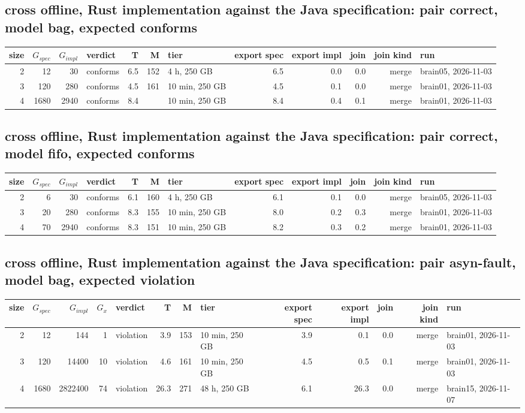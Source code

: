 \documentclass[10pt]{article}
\begin{document}
\subsection*{cross offline, Rust implementation against the Java specification: pair \textsf{correct}, model bag, expected conforms}
\begin{longtable}{@{}rrrlrrlrrrrl@{}}
\toprule
size & $G_{\mathit{spec}}$ & $G_{\mathit{impl}}$ & verdict & T & M & tier & export spec & export impl & join & join kind & run \\
\midrule
\endhead
\color{blue} 2 & 12 & 30 & conforms & 6.5 & 152 & 4 h, 250 GB & 6.5 & 0.0 & 0.0 & merge & brain05, 2026-11-03 \\
\color{blue} 3 & 120 & 280 & conforms & 4.5 & 161 & 10 min, 250 GB & 4.5 & 0.1 & 0.0 & merge & brain01, 2026-11-03 \\
\color{blue} 4 & 1680 & 2940 & conforms & 8.4 &  & 10 min, 250 GB & 8.4 & 0.4 & 0.1 & merge & brain01, 2026-11-03 \\
\bottomrule
\end{longtable}
\subsection*{cross offline, Rust implementation against the Java specification: pair \textsf{correct}, model fifo, expected conforms}
\begin{longtable}{@{}rrrlrrlrrrrl@{}}
\toprule
size & $G_{\mathit{spec}}$ & $G_{\mathit{impl}}$ & verdict & T & M & tier & export spec & export impl & join & join kind & run \\
\midrule
\endhead
\color{blue} 2 & 6 & 30 & conforms & 6.1 & 160 & 4 h, 250 GB & 6.1 & 0.1 & 0.0 & merge & brain05, 2026-11-03 \\
\color{blue} 3 & 20 & 280 & conforms & 8.3 & 155 & 10 min, 250 GB & 8.0 & 0.2 & 0.3 & merge & brain01, 2026-11-03 \\
\color{blue} 4 & 70 & 2940 & conforms & 8.3 & 151 & 10 min, 250 GB & 8.2 & 0.3 & 0.2 & merge & brain01, 2026-11-03 \\
\bottomrule
\end{longtable}
\subsection*{cross offline, Rust implementation against the Java specification: pair \textsf{asyn-fault}, model bag, expected violation}
\begin{longtable}{@{}rrrrlrrlrrrrl@{}}
\toprule
size & $G_{\mathit{spec}}$ & $G_{\mathit{impl}}$ & $G_x$ & verdict & T & M & tier & export spec & export impl & join & join kind & run \\
\midrule
\endhead
\color{blue} 2 & 12 & 144 & 1 & violation & 3.9 & 153 & 10 min, 250 GB & 3.9 & 0.1 & 0.0 & merge & brain01, 2026-11-03 \\
\color{blue} 3 & 120 & 14400 & 10 & violation & 4.6 & 161 & 10 min, 250 GB & 4.5 & 0.5 & 0.1 & merge & brain01, 2026-11-03 \\
\color{red} 4 & 1680 & 2822400 & 74 & violation & 26.3 & 271 & 48 h, 250 GB & 6.1 & 26.3 & 0.0 & merge & brain15, 2026-11-07 \\
\bottomrule
\end{longtable}
\end{document}
